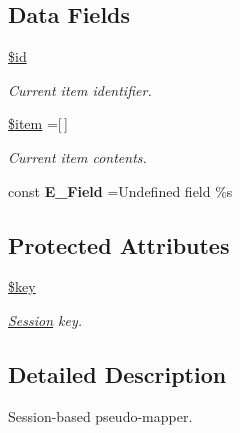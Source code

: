 \subsection*{Data Fields}
\begin{DoxyCompactItemize}
\item 
\hypertarget{class_basket_ae97941710d863131c700f069b109991e}{}\label{class_basket_ae97941710d863131c700f069b109991e} 
\hyperlink{class_basket_ae97941710d863131c700f069b109991e}{\$id}
\begin{DoxyCompactList}\small\item\em Current item identifier. \end{DoxyCompactList}\item 
\hypertarget{class_basket_aa61b415cee119a7511e05c405ecd0b32}{}\label{class_basket_aa61b415cee119a7511e05c405ecd0b32} 
\hyperlink{class_basket_aa61b415cee119a7511e05c405ecd0b32}{\$item} =\mbox{[}$\,$\mbox{]}
\begin{DoxyCompactList}\small\item\em Current item contents. \end{DoxyCompactList}\end{DoxyCompactItemize}
{\bf }\par
\begin{DoxyCompactItemize}
\item 
\hypertarget{class_basket_aa2e3f553fd1f1c2053bc084118c10396}{}\label{class_basket_aa2e3f553fd1f1c2053bc084118c10396} 
const {\bfseries E\+\_\+\+Field} =\textquotesingle{}Undefined field \%s\textquotesingle{}
\end{DoxyCompactItemize}

\subsection*{Protected Attributes}
\begin{DoxyCompactItemize}
\item 
\hypertarget{class_basket_aa60b0284e0dfa2463495481cf11e3cf4}{}\label{class_basket_aa60b0284e0dfa2463495481cf11e3cf4} 
\hyperlink{class_basket_aa60b0284e0dfa2463495481cf11e3cf4}{\$key}
\begin{DoxyCompactList}\small\item\em \hyperlink{class_session}{Session} key. \end{DoxyCompactList}\end{DoxyCompactItemize}


\subsection{Detailed Description}
Session-\/based pseudo-\/mapper. 

